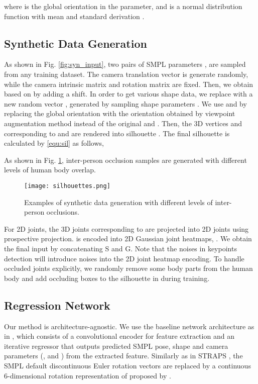 \documentclass[journal]{IEEEtran}
\begin{document}
where  is the global orientation in the  parameter, and  is  a normal distribution function with mean  and standard derivation .

\subsection{Synthetic Data Generation}
As shown in Fig. \ref{fig:syn_input}, two pairs of SMPL parameters , are sampled from any training dataset. The camera translation vector  is generate randomly, while the camera intrinsic matrix  and rotation matrix  are fixed. Then, we obtain  based on  by adding a shift. In order to get various shape data, we replace  with a new random vector , generated by sampling  shape parameters  \cite{STRAPS2020BMVC}. We use  and  by replacing the global orientation with the orientation  obtained by viewpoint augmentation method instead of the original  and . Then, the 3D vertices  and  corresponding to  and  are rendered \cite{kato2018neural} into silhouette . The final silhouette is calculated by {\eqref{equ:sil}} as follows,

As shown in Fig. \ref{fig:samples}, inter-person occlusion samples are generated with different levels of human body overlap.

\begin{figure}[htbp]
    \centerline{\texttt{[image: silhouettes.png]}}
    \caption{Examples of synthetic data generation with different levels of inter-person occlusions. }
    \label{fig:samples}
\end{figure}

For 2D joints, the 3D joints  corresponding to  are projected into 2D joints  using prospective projection.  is encoded into 2D Gaussian joint heatmaps, . We obtain the final input  by concatenating S and G. Note that the noises in keypoints detection will introduce noises into the 2D joint heatmap encoding. To handle occluded joints explicitly, we randomly remove some body parts from the human body and add occluding boxes to the silhouette in  during training.

\subsection{Regression Network}
\label{sec:regression}
Our method is architecture-agnostic. We use the baseline network architecture as in \cite{ kanazawa2018end, kolotouros2019spin,STRAPS2020BMVC}, which consists of a convolutional encoder for feature extraction and an iterative regressor that outputs predicted SMPL pose, shape and camera parameters (,  and ) from the extracted feature. Similarly as in STRAPS \cite{STRAPS2020BMVC}, the SMPL default discontinuous Euler rotation vectors are replaced by a continuous 6-dimensional rotation representation of  proposed by \cite{zhou2019continuity}.
\end{document}
